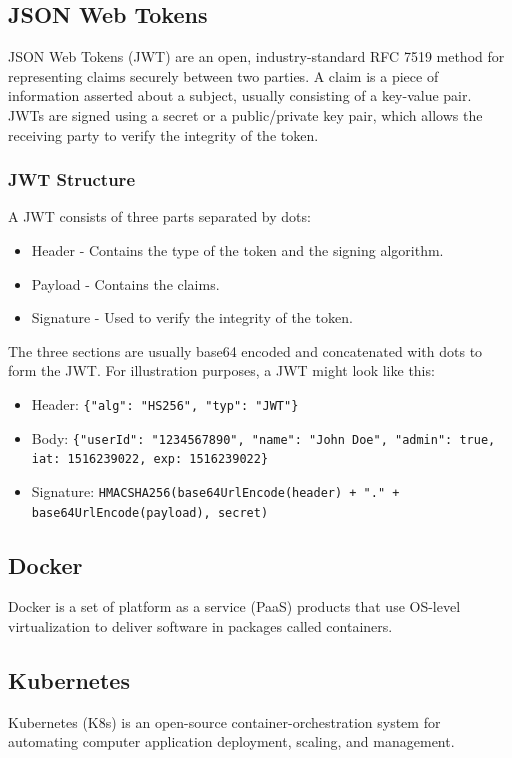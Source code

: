\documentclass[12pt]{article}
\begin{document}
\subsection{JSON Web Tokens}
JSON Web Tokens (JWT)\cite{jonesJSONWebToken2015} are an open, industry-standard RFC 7519 method for representing claims securely between two parties.
A claim is a piece of information asserted about a subject, usually consisting of a key-value pair.
JWTs are signed using a secret or a public/private key pair, which allows the receiving party to verify the integrity of the token.
\subsubsection{JWT Structure}
A JWT consists of three parts separated by dots:
\begin{itemize}
    \item Header - Contains the type of the token and the signing algorithm.
    \item Payload - Contains the claims.
    \item Signature - Used to verify the integrity of the token.
\end{itemize}
The three sections are usually base64 encoded and concatenated with dots to form the JWT.
For illustration purposes, a JWT might look like this:
\begin{itemize}
    \item Header: \texttt{\{"alg": "HS256", "typ": "JWT"\}}
    \item Body: \texttt{\{"userId": "1234567890", "name": "John Doe", "admin": true, iat: 1516239022, exp: 1516239022\}}
    \item Signature: \texttt{HMACSHA256(base64UrlEncode(header) + "." + \\ base64UrlEncode(payload), secret)}
\end{itemize}


\subsection{Docker}
Docker\cite{DockerAcceleratedContainer2022} is a set of platform as a service (PaaS) products that use OS-level virtualization to deliver software in packages called containers.

\subsection{Kubernetes}
Kubernetes (K8s)\cite{ProductionGradeContainerOrchestration} is an open-source container-orchestration system for automating computer application deployment, scaling, and management.
\end{document}
